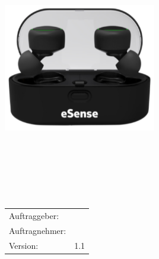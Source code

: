\begin{titlepage}
\maketitle
\thispagestyle{empty} %

\begin{verbatim}






	




\end{verbatim}
\begin{center}
\includegraphics[width=0.5\textwidth]{EarablesBild.PNG}
\end{center}
\begin{verbatim}






\end{verbatim}


  \begin{tabular}[t]{p{4 cm}p{8 cm}}
	Auftraggeber:  & \auftraggeber\\[1.2ex]
	Auftragnehmer: & \auftragnehmer\\[1.2ex]
	Version:       & 1.1\\[1.2ex]
  \end{tabular}


\end{titlepage}
